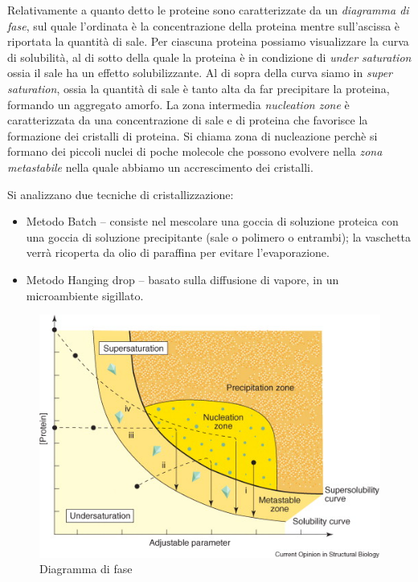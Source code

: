 \documentclass[twocolumn,a4paper,10pt]{my_report}
\begin{document}
{Relativamente a quanto detto le proteine sono caratterizzate da un \emph{diagramma di fase}, sul quale l'ordinata è la concentrazione della proteina mentre sull'ascissa è riportata la quantità di sale. Per ciascuna proteina possiamo visualizzare la curva di solubilità, al di sotto della quale la proteina è in condizione di \emph{under saturation} ossia il sale ha un effetto solubilizzante.
Al di sopra della curva siamo in \emph{super saturation}, ossia la quantità di sale è tanto alta da far precipitare la proteina, formando un aggregato amorfo.
La zona intermedia \emph{nucleation zone} è caratterizzata da una concentrazione di sale e di proteina che favorisce la formazione dei cristalli di proteina. Si chiama zona di nucleazione perchè si formano dei piccoli nuclei di poche molecole che possono evolvere nella \emph{zona metastabile} nella quale abbiamo un accrescimento dei cristalli.

Si analizzano due tecniche di cristallizzazione:
\begin{itemize}
\item Metodo Batch -- consiste nel mescolare una goccia di soluzione proteica con una goccia di soluzione precipitante (sale o polimero o entrambi);
 la vaschetta verrà ricoperta da olio di paraffina per evitare l'evaporazione.
 \item Metodo Hanging drop -- basato sulla diffusione di vapore, in un microambiente sigillato.
\end{itemize}
\begin{figure}[htbp]
\centering
\includegraphics[width=0.8\linewidth]{curva_3.jpg}
\caption{Diagramma di fase}
\label{fig:fig11}
\end{figure}




}
\end{document}
